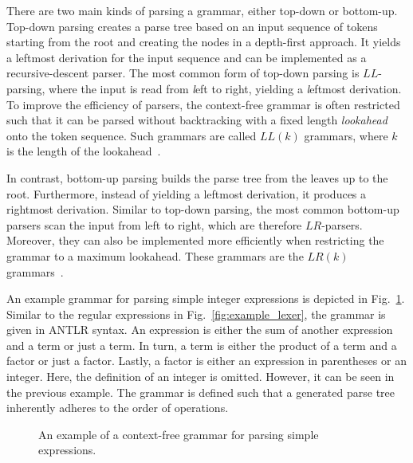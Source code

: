 There are two main kinds of parsing a grammar, either top-down or bottom-up.
Top-down parsing creates a parse tree based on an input sequence of tokens starting from the root and creating the nodes in a depth-first approach. It yields a leftmost derivation for the input sequence and can be implemented as a recursive-descent parser. The most common form of top-down parsing is $LL$-parsing, where the input is read from \emph{l}eft to right, yielding a \emph{l}eftmost derivation. To improve the efficiency of parsers, the context-free grammar is often restricted such that it can be parsed without backtracking with a fixed length \emph{lookahead} onto the token sequence. Such grammars are called $LL(k)$ grammars, where $k$ is the length of the lookahead~\cite{VSSD07,PaFi11}.

In contrast, bottom-up parsing builds the parse tree from the leaves up to the root. Furthermore, instead of yielding a leftmost derivation, it produces a rightmost derivation. Similar to top-down parsing, the most common bottom-up parsers scan the input from left to right, which are therefore $LR$-parsers. Moreover, they can also be implemented more efficiently when restricting the grammar to a maximum lookahead. These grammars are the $LR(k)$ grammars~\cite{VSSD07, PaFi11}.

An example grammar for parsing simple integer expressions is depicted in Fig.~\ref{fig:example_parser}. Similar to the regular expressions in Fig.~\ref{fig:example_lexer}, the grammar is given in ANTLR syntax. An expression is either the sum of another expression and a term or just a term. In turn, a term is either the product of a term and a factor or just a factor. Lastly, a factor is either an expression in parentheses or an integer. Here, the definition of an integer is omitted. However, it can be seen in the previous example. The grammar is defined such that a generated parse tree inherently adheres to the order of operations.

\begin{figure}[htp]
    \centering
    
    \caption{An example of a context-free grammar for parsing simple expressions.}
    \label{fig:example_parser}
\end{figure}


